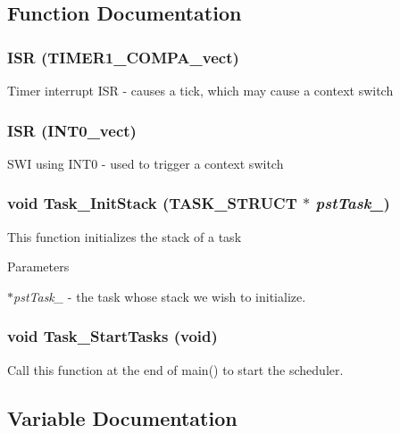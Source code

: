 \subsection{Function Documentation}
\subsubsection[{ISR}]{\setlength{\rightskip}{0pt plus 5cm}ISR (TIMER1\_\-COMPA\_\-vect)}\label{taskport_8c_ad39420cdd896dd12c68e36313139d0a5}
Timer interrupt ISR -\/ causes a tick, which may cause a context switch 
\subsubsection[{ISR}]{\setlength{\rightskip}{0pt plus 5cm}ISR (INT0\_\-vect)}\label{taskport_8c_afea150fcd685610cb9f7672fce361e53}
SWI using INT0 -\/ used to trigger a context switch 
\subsubsection[{Task\_\-InitStack}]{\setlength{\rightskip}{0pt plus 5cm}void Task\_\-InitStack ({\bf TASK\_\-STRUCT} $\ast$ {\em pstTask\_\-})}\label{taskport_8c_a1b30a9b6f0c4428cc8f64c34c7fe7d65}
This function initializes the stack of a task


\begin{DoxyParams}{Parameters}
\item[{\em $\ast$pstTask\_\-}]-\/ the task whose stack we wish to initialize. \end{DoxyParams}
\subsubsection[{Task\_\-StartTasks}]{\setlength{\rightskip}{0pt plus 5cm}void Task\_\-StartTasks (void)}\label{taskport_8c_a92f7efeeee257ca19025275ed9c1ad88}
Call this function at the end of main() to start the scheduler. 

\subsection{Variable Documentation}
